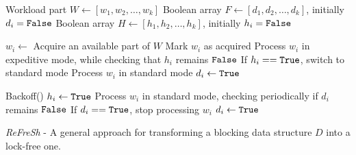 
\begin{algorithm}[htbp]
    \footnotesize
    \vspace*{2mm}
    
    \begin{algorithmic}[1]
    
        \State Workload part $\mathit{W} \gets [w_1, w_2, \ldots, w_k]$ \label{alg:refresh:w}
        \State Boolean array $\mathit{F} \gets [d_1, d_2, \ldots, d_k]$, initially $d_i = \mbox{\texttt{False}}$ \label{alg:refresh:d}
        \State Boolean array $\mathit{H} \gets [h_1, h_2, \ldots, h_k]$, initially $h_i = \mbox{\texttt{False}}$ \label{alg:refresh:h}
    \EndProcedure
    
    \vspace*{1mm}
    \vspace*{1mm}
    
          \label{alg:refresh:process:start}
            \State $\mathit{w_i} \gets$ Acquire an available part of $\mathit{W}$
            \State Mark $\mathit{w_i}$ as acquired
              \label{alg:refresh:process:if}
                \State Process $\mathit{w_i}$ in expeditive mode, while checking that $h_i$ remains $\mbox{\texttt{False}}$ \label{alg:refresh:process:expeditive}
                \State If $h_i == \mbox{\texttt{True}}$, switch to standard mode
            \Else
                \State Process $\mathit{w_i}$ in standard mode \label{alg:refresh:process:standard}
            \EndIf
            \State $d_i \gets \mbox{\texttt{True}}$ \label{alg:refresh:d:true}
        \EndWhile
        
        \vspace*{1mm}
          \label{alg:refresh:scan:ForAll} 
            \State Backoff()   \label{alg:refresh:help:backoff}
              \label{alg:refresh:help:if}
                \State $h_i \gets \mbox{\texttt{True}}$ \label{alg:refresh:h:true}
                \State Process $\mathit{w_i}$ in standard mode, checking periodically if $d_i$ remains $\mbox{\texttt{False}}$ \label{alg:refresh:help:process}
                \State If $d_i == \mbox{\texttt{True}}$, stop processing $\mathit{w_i}$
                \State $d_i \gets \mbox{\texttt{True}}$ \label{alg:refresh:help:d:true}
            \EndIf
        \EndFor
    \EndProcedure
    
    \end{algorithmic}
    
    \caption{\textit{ReFreSh} - A general approach for transforming a blocking data structure $\mathit{D}$ into a lock-free one.}
    \label{alg:refresh}
\end{algorithm}

